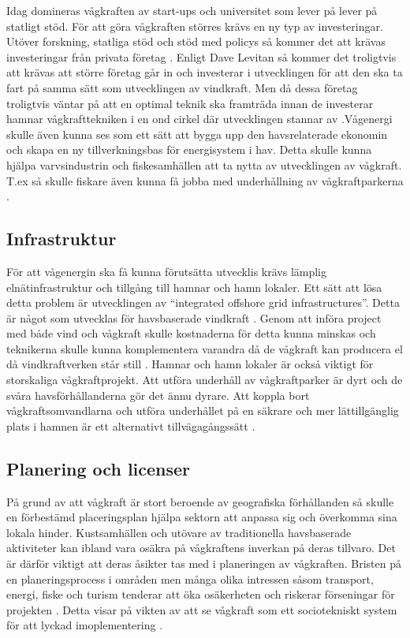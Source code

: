 \documentclass[10pt,a4paper,oneside]{article}
\begin{document}
Idag domineras vågkraften av start-ups och universitet som lever på lever på statligt stöd. För att göra vågkraften störres krävs en ny typ av investeringar. Utöver forskning, statliga stöd och stöd med policys så kommer det att krävas investeringar från privata företag \cite{IRENA}. Enligt Dave Levitan så kommer det troligtvis att krävas att större företag går in och investerar i utvecklingen för att den ska ta fart på samma sätt som utvecklingen av vindkraft. Men då dessa företag troligtvis väntar på att en optimal teknik ska framträda innan de investerar hamnar vågkrafttekniken i en ond cirkel där utvecklingen stannar av \cite{Yale}.Vågenergi skulle även kunna ses som ett sätt att bygga upp den havsrelaterade ekonomin och skapa en ny tillverkningsbas för energisystem i hav. Detta skulle kunna hjälpa varvsindustrin och fiskesamhällen att ta nytta av utvecklingen av vågkraft. T.ex så skulle fiskare även kunna få jobba med underhållning av vågkraftparkerna \cite{IRENA}. 

\subsection{Infrastruktur}
För att vågenergin ska få kunna förutsätta utvecklis krävs lämplig elnätinfrastruktur och tillgång till hamnar och hamn lokaler. Ett sätt att lösa detta problem är utvecklingen av “integrated offshore grid infrastructures”. Detta är något som utvecklas för havsbaserade vindkraft \cite{IRENA}. Genom att införa project med både vind och vågkraft skulle kostnaderna för detta kunna minskas och teknikerna skulle kunna komplementera varandra då de vågkraft kan producera el då vindkraftverken står still \cite{Yale}. Hamnar och hamn lokaler är också viktigt för storskaliga vågkraftprojekt. Att utföra underhåll av vågkraftparker är dyrt och de svåra havsförhållanderna gör det ännu dyrare. Att koppla bort vågkraftsomvandlarna och utföra underhållet på en säkrare och mer lättillgänglig plats i hamnen är ett alternativt tillvägagångssätt \cite{IRENA}. 

\subsection{Planering och licenser}
På grund av att vågkraft är stort beroende av geografiska förhållanden så skulle en förbestämd placeringsplan hjälpa sektorn att anpassa sig och överkomma sina lokala hinder. Kustsamhällen och utövare av traditionella havsbaserade aktiviteter kan ibland vara osäkra på vågkraftens inverkan på deras tillvaro. Det är därför viktigt att deras åsikter tas med i planeringen av vågkraften. Bristen på en planeringsprocess i områden men många olika intressen såsom transport, energi, fiske och turism tenderar att öka osäkerheten och riskerar förseningar för projekten \cite{IRENA}. Detta visar på vikten av att se vågkraft som ett sociotekniskt system för att lyckad imoplementering \cite{Hård}.
\end{document}
